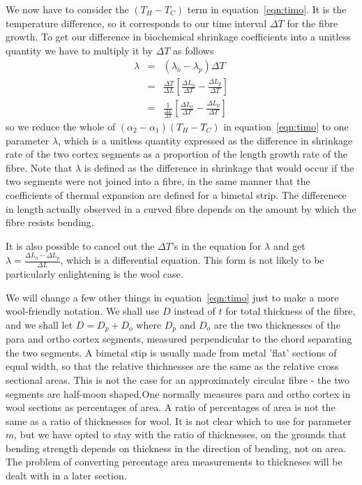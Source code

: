 \documentclass[titlepage]{article}  %
\begin{document}
  We now have to consider the $(T_{H} - T_{C})$ term in equation~\ref{eqn:timo}. It is the temperature difference, so it corresponds to our time interval $\Delta T$ for the fibre growth. To get our difference in biochemical shrinkage coefficients into a unitless quantity we have to multiply it by $\Delta T$ as follows
\begin{eqnarray*}
 \lambda & = & (\lambda_{o} - \lambda_{p}) \Delta T \\
        & = & \frac{\Delta T}{\Delta L}\left[ \frac{\Delta L_{o}}{\Delta T} - \frac{\Delta L_{p}}{\Delta T} \right] \\
        & = & \frac{1}{\frac{\Delta L}{\Delta T}} \left[ \frac{\Delta L_{o}}{\Delta T} - \frac{\Delta L_{p}}{\Delta T} \right]
\end{eqnarray*}
so we reduce the whole of  $(\alpha_{2}- \alpha_{1})(T_{H} - T_{C})$ in equation~\ref{eqn:timo} to one parameter $\lambda$, which is a unitless quantity expressed as the difference in shrinkage rate of the two cortex segments as a proportion of the length growth rate of the fibre. Note that $\lambda$ is defined as the difference in shrinkage that would occur if the two segments were not joined into a fibre, in the same manner that the coefficients of thermal expansion are defined for a bimetal strip. The differenece in length actually observed in a curved fibre depends on the amount by which the fibre resists bending.

It is also possible to cancel out the $\Delta T$'s in the equation for $\lambda$ and get $\lambda = \frac{\Delta L_{o} - \Delta L_{p}}{\Delta L}$, which is a differential equation. This form is not likely to be particularly enlightening is the wool case.

 We will change a few other things in equation~\ref{eqn:timo} just to  make a more wool-friendly notation. We shall use $D$ instead of $t$ for total thickness of the fibre, and we shall let $D = D_{p} + D_{o}$ where $D_{p}$ and $D_{o}$ are the two thicknesses of the para and ortho cortex segments, measured perpendicular to the chord separating the two segments.  A bimetal stip is usually made from metal 'flat' sections of equal width, so that the relative thichnesses are the same as the relative cross sectional areas. This is not the case for an approximately circular fibre - the two segments are half-moon shaped.One normally measures para and ortho cortex in wool sections as percentages of area. A ratio of percentages of area is not the same as a ratio of thicknesses for wool. It is not clear which to use for parameter $m$, but we have opted to stay with the ratio of thicknesses, on the grounds that bending strength depends on thickness in the direction of bending, not on area. The problem of converting percentage area measurements to thickneses will be dealt with in a later section.
\end{document}
